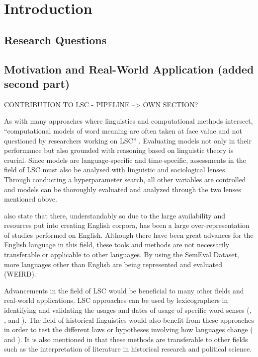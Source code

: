 

\section{Introduction}
\label{sec:intro}

\subsection{Research Questions}

\subsection{Motivation and Real-World Application (added second part)}
CONTRIBUTION TO LSC - PIPELINE --> OWN SECTION?

As with many approaches where linguistics and computational methods intersect, “computational models of word meaning are often taken at face value and not questioned by researchers working on LSC” \citep{hengchen2021challenges}. Evaluating models not only in their performance but also grounded with reasoning based on linguistic theory is crucial. Since models are language-specific and time-specific, assessments in the field of LSC must also be analysed with linguistic and sociological lenses. Through conducting a hyperparameter search, all other variables are controlled and models can be thoroughly evaluated and analyzed through the two lenses mentioned above. 

\citet{hengchen2021challenges} also state that there, understandably so due to the large availability and resources put into creating English corpora, has been a large over-representation of studies performed on English. Although there have been great advances for the English language in this field, these tools and methods are not necessarily transferable or applicable to other languages. By using the SemEval Dataset, more languages other than English are being represented and evaluated (WEIRD).  

Advancements in the field of LSC would be beneficial to many other fields and real-world applications. LSC approaches can be used by lexicographers in identifying and validating the usages and dates of usage of specific word senses (\citet{lau-etal-2012-word}, \citet{falk-etal-2014-non}, and \citet{klosa-2018-newgerman}). The field of historical linguistics would also benefit from these approaches in order to test the different laws or hypotheses involving how languages change (\citet{hamilton-etal-2016-diachronic} and \citet{Xu2015ACE}). It is also mentioned in \citet{hengchen2021challenges} that these methods are transferable to other fields such as the interpretation of literature in historical research and political science.  

